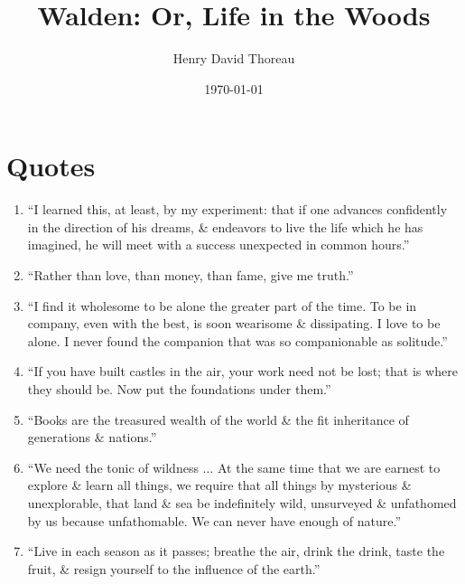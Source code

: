 \documentclass{article}
\title{Walden: Or, Life in the Woods}
\author{Henry David Thoreau}
\date{\today}
\numberwithin{equation}{section}
\begin{document}
\maketitle
\tableofcontents

\section{Quotes}

\begin{enumerate}
	\item ``I learned this, at least, by my experiment: that if one advances confidently in the direction of his dreams, \& endeavors to live the life which he has imagined, he will meet with a success unexpected in common hours.''
	\item ``Rather than love, than money, than fame, give me truth.''
	\item ``I find it wholesome to be alone the greater part of the time. To be in company, even with the best, is soon wearisome \& dissipating. I love to be alone. I never found the companion that was so companionable as solitude.''
	\item ``If you have built castles in the air, your work need not be lost; that is where they should be. Now put the foundations under them.''
	\item ``Books are the treasured wealth of the world \& the fit inheritance of generations \& nations.''
	\item ``We need the tonic of wildness $\ldots$ At the same time that we are earnest to explore \& learn all things, we require that all things by mysterious \& unexplorable, that land \& sea be indefinitely wild, unsurveyed \& unfathomed by us because unfathomable. We can never have enough of nature.''
	\item ``Live in each season as it passes; breathe the air, drink the drink, taste the fruit, \& resign yourself to the influence of the earth.''
\end{enumerate}


\printbibliography[heading=bibintoc]
	
\end{document}
